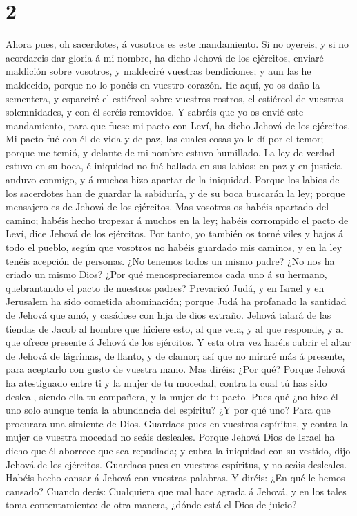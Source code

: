 \hypertarget{section-1}{%
\section{2}\label{section-1}}

 Ahora pues, oh sacerdotes, á vosotros es este
mandamiento.  Si no oyereis, y si no acordareis dar gloria
á mi nombre, ha dicho Jehová de los ejércitos, enviaré maldición sobre
vosotros, y maldeciré vuestras bendiciones; y aun las he maldecido,
porque no lo ponéis en vuestro corazón.  He aquí, yo os
daño la sementera, y esparciré el estiércol sobre vuestros rostros, el
estiércol de vuestras solemnidades, y con él seréis removidos.
 Y sabréis que yo os envié este mandamiento, para que
fuese mi pacto con Leví, ha dicho Jehová de los ejércitos.
 Mi pacto fué con él de vida y de paz, las cuales cosas yo
le dí por el temor; porque me temió, y delante de mi nombre estuvo
humillado.  La ley de verdad estuvo en su boca, é
iniquidad no fué hallada en sus labios: en paz y en justicia anduvo
conmigo, y á muchos hizo apartar de la iniquidad.  Porque
los labios de los sacerdotes han de guardar la sabiduría, y de su boca
buscarán la ley; porque mensajero es de Jehová de los ejércitos.
 Mas vosotros os habéis apartado del camino; habéis hecho
tropezar á muchos en la ley; habéis corrompido el pacto de Leví, dice
Jehová de los ejércitos.  Por tanto, yo también os torné
viles y bajos á todo el pueblo, según que vosotros no habéis guardado
mis caminos, y en la ley tenéis acepción de personas. 
¿No tenemos todos un mismo padre? ¿No nos ha criado un mismo Dios? ¿Por
qué menospreciaremos cada uno á su hermano, quebrantando el pacto de
nuestros padres?  Prevaricó Judá, y en Israel y en
Jerusalem ha sido cometida abominación; porque Judá ha profanado la
santidad de Jehová que amó, y casádose con hija de dios extraño.
 Jehová talará de las tiendas de Jacob al hombre que
hiciere esto, al que vela, y al que responde, y al que ofrece presente á
Jehová de los ejércitos.  Y esta otra vez haréis cubrir
el altar de Jehová de lágrimas, de llanto, y de clamor; así que no
miraré más á presente, para aceptarlo con gusto de vuestra mano.
 Mas diréis: ¿Por qué? Porque Jehová ha atestiguado entre
ti y la mujer de tu mocedad, contra la cual tú has sido desleal, siendo
ella tu compañera, y la mujer de tu pacto.  Pues qué ¿no
hizo él uno solo aunque tenía la abundancia del espíritu? ¿Y por qué
uno? Para que procurara una simiente de Dios. Guardaos pues en vuestros
espíritus, y contra la mujer de vuestra mocedad no seáis desleales.
 Porque Jehová Dios de Israel ha dicho que él aborrece
que sea repudiada; y cubra la iniquidad con su vestido, dijo Jehová de
los ejércitos. Guardaos pues en vuestros espíritus, y no seáis
desleales.  Habéis hecho cansar á Jehová con vuestras
palabras. Y diréis: ¿En qué le hemos cansado? Cuando decís: Cualquiera
que mal hace agrada á Jehová, y en los tales toma contentamiento: de
otra manera, ¿dónde está el Dios de juicio?

